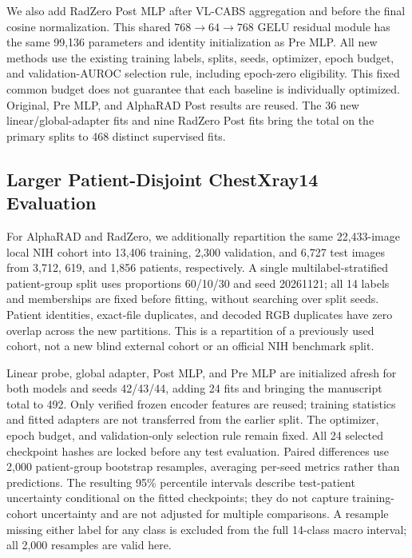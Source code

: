 \documentclass[10pt,twocolumn,letterpaper]{article}
\begin{document}
We also add RadZero Post MLP after VL-CABS aggregation and before the final cosine normalization. This shared $768\to64\to768$ GELU residual module has the same 99,136 parameters and identity initialization as Pre MLP. All new methods use the existing training labels, splits, seeds, optimizer, epoch budget, and validation-AUROC selection rule, including epoch-zero eligibility. This fixed common budget does not guarantee that each baseline is individually optimized. Original, Pre MLP, and AlphaRAD Post results are reused. The 36 new linear/global-adapter fits and nine RadZero Post fits bring the total on the primary splits to 468 distinct supervised fits.

\subsection{Larger Patient-Disjoint ChestXray14 Evaluation}
\label{sec:large_patient_protocol}
For AlphaRAD and RadZero, we additionally repartition the same 22,433-image local NIH cohort into 13,406 training, 2,300 validation, and 6,727 test images from 3,712, 619, and 1,856 patients, respectively. A single multilabel-stratified patient-group split uses proportions 60/10/30 and seed 20261121; all 14 labels and memberships are fixed before fitting, without searching over split seeds. Patient identities, exact-file duplicates, and decoded RGB duplicates have zero overlap across the new partitions. This is a repartition of a previously used cohort, not a new blind external cohort or an official NIH benchmark split.

Linear probe, global adapter, Post MLP, and Pre MLP are initialized afresh for both models and seeds 42/43/44, adding 24 fits and bringing the manuscript total to 492. Only verified frozen encoder features are reused; training statistics and fitted adapters are not transferred from the earlier split. The optimizer, epoch budget, and validation-only selection rule remain fixed. All 24 selected checkpoint hashes are locked before any test evaluation. Paired differences use 2,000 patient-group bootstrap resamples, averaging per-seed metrics rather than predictions. The resulting 95\% percentile intervals describe test-patient uncertainty conditional on the fitted checkpoints; they do not capture training-cohort uncertainty and are not adjusted for multiple comparisons. A resample missing either label for any class is excluded from the full 14-class macro interval; all 2,000 resamples are valid here.
\end{document}
